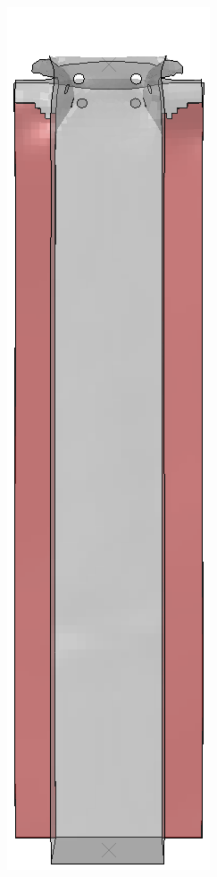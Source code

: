 \documentclass[
documentsize = a4, %
font = cmr, %
typesize = 11, %
printmode = true,
onehalfspacing = true,
language = en, %
titlepage = udciccp, %
degree = pt, %
dedication = true,
acknowledgements = true,
abstract-en = true,
abstract-es = false,
abstract-ga = false,
epigraphs = true,
toc = true,
lof = true,
lot = true,
frontmatterintoc = false,
notation = false,
minimal = false,
]{UDCthesis}
\begin{document}
\begin{figure}
\begin{minipage}[b]{.06\linewidth}
	\end{minipage}
	\quad
	\begin{minipage}[b]{.06\linewidth}
		\centering
		\includegraphics[width=\linewidth]{IMG_CUTRES/a1}

\end{minipage}
\end{figure}
\end{document}
